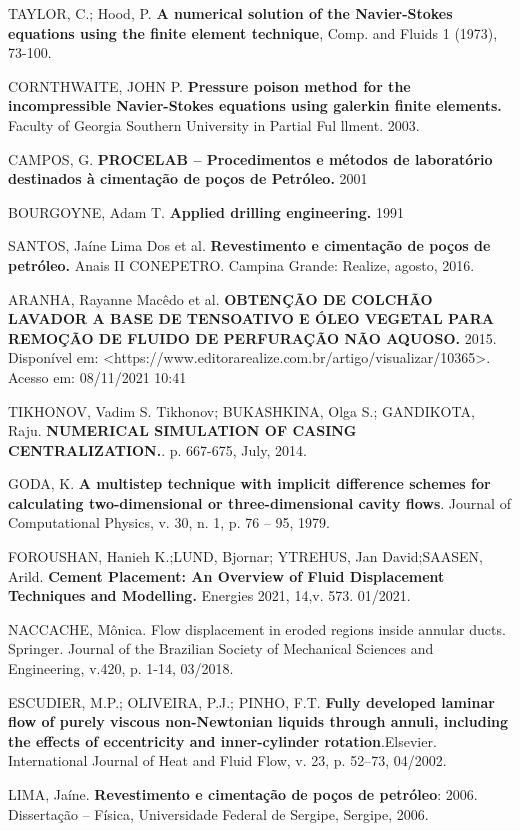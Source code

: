  TAYLOR, C.; Hood, P. {\bf A numerical solution of the Navier-Stokes equations using the finite element technique}, Comp. and Fluids 1 (1973), 73-100.

 CORNTHWAITE, JOHN P. {\bf Pressure poison method for the incompressible Navier-Stokes equations using galerkin finite elements.} Faculty of Georgia Southern University in Partial Ful llment. 2003.

 CAMPOS, G. {\bf PROCELAB – Procedimentos e métodos de laboratório destinados à cimentação de poços de Petróleo.} 2001

BOURGOYNE, Adam T. {\bf Applied drilling engineering.} 1991

SANTOS, Jaíne Lima Dos et al. {\bf Revestimento e cimentação de poços de petróleo.} Anais II CONEPETRO. Campina Grande: Realize, agosto, 2016.

 ARANHA, Rayanne Macêdo et al. {\bf OBTENÇÃO DE COLCHÃO LAVADOR A BASE DE TENSOATIVO E ÓLEO VEGETAL PARA REMOÇÃO DE FLUIDO DE PERFURAÇÃO NÃO AQUOSO.} 2015. Disponível em: <https://www.editorarealize.com.br/artigo/visualizar/10365>. Acesso em: 08/11/2021 10:41

TIKHONOV, Vadim S. Tikhonov; BUKASHKINA, Olga S.; GANDIKOTA, Raju. {\bf NUMERICAL SIMULATION OF CASING CENTRALIZATION.}. p. 667-675, July, 2014.

 GODA, K. {\bf A multistep technique with implicit difference schemes for calculating two-dimensional or three-dimensional cavity flows}. Journal of Computational Physics, v. 30, n. 1, p. 76 – 95, 1979.

FOROUSHAN, Hanieh K.;LUND, Bjornar; YTREHUS, Jan David;SAASEN, Arild. {\bf Cement Placement: An Overview of Fluid Displacement Techniques and Modelling.} Energies 2021, 14,v. 573. 01/2021.

NACCACHE, Mônica. Flow displacement in eroded regions inside annular ducts. Springer. Journal of the Brazilian Society of Mechanical Sciences and Engineering, v.420, p. 1-14, 03/2018.

ESCUDIER, M.P.; OLIVEIRA, P.J.; PINHO, F.T. {\bf Fully developed laminar flow of purely viscous non-Newtonian
liquids through annuli, including the effects of eccentricity and inner-cylinder rotation}.Elsevier. International Journal of Heat and Fluid Flow, v. 23, p. 52–73, 04/2002.

LIMA, Jaíne. {\bf Revestimento e cimentação de poços de petróleo}: 2006. Dissertação – Física, Universidade Federal de Sergipe, Sergipe, 2006.

